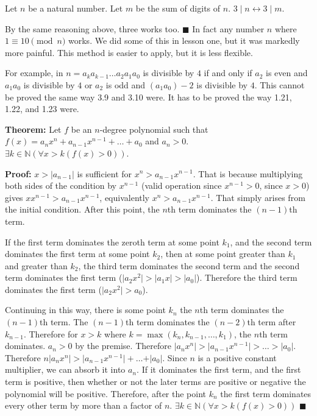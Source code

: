 \item Let \(n\) be a natural number.  Let \(m\) be the sum of digits of \(n\). \(3 \mid n \leftrightarrow 3 \mid m\).

By the same reasoning above, three works too. {\tiny \(\blacksquare\)} In fact any number \(n\) where \(1 \equiv 10 \pmod n\) works. We did some of this in lesson one, but it was markedly more painful. This method is easier to apply, but it is less flexible.

For example, in \(n = a_k a_{k-1} \dots a_2 a_1 a_0\) is divisible by \(4\) if and only if  \(a_2\) is even and \(a_1 a_0\) is divisible by \(4\) or \(a_2\) is odd and \((a_1 a_0) - 2\) is divisible by \(4\). This cannot be proved the same way 3.9 and 3.10 were. It has to be proved the way 1.21, 1.22, and 1.23 were.

\item \textbf{Theorem:} Let \(f\) be an \(n\)-degree polynomial such that \(f(x) = a_n x^n + a_{n-1} x^{n-1} + \dots + a_0 \) and \(a_n > 0\). \(\exists k \in \mathbb N (\forall x > k (f(x) > 0))\).

\textbf{Proof:} \(x > \lvert a_{n-1} \rvert\) is sufficient for \(x^n > a_{n-1} x^{n-1}\). That is because multiplying both sides of the condition by \(x^{n-1}\) (valid operation since \(x^{n-1}>0\), since \(x>0\)) gives \(x x^{n-1} > a_{n-1} x^{n-1}\), equivalently \(x^n  > a_{n-1} x^{n-1}\). That simply arises from the initial condition. After this point, the \(n\)th term dominates the \((n-1)\)th term.

If the first term dominates the zeroth term at some point \(k_1\), and the second term dominates the first term at some point \(k_2\), then at some point greater than \(k_1\) and greater than \(k_2\), the third term dominates the second term and the second term dominates the first term (\(\lvert a_2 x^2 \rvert > \lvert a_1 x \rvert > \lvert a_0 \rvert\)). Therefore the third term dominates the first term (\(\lvert a_2 x^2 \rvert > a_0\)). 

Continuing in this way, there is some point \(k_n\) the \(n\)th term dominates the \((n-1)\)th term. The \((n-1)\)th term dominates the \((n-2)\)th term after \(k_{n-1}\). Therefore for \(x > k\) where \(k = \max(k_n, k_{n-1}, \dots, k_1)\), the \(n\)th term dominates. \(a_n > 0\) by the premise. Therefore \(\lvert a_n x^n \rvert > \lvert a_{n-1} x^{n-1} \rvert > \dots > \rvert a_0 \lvert\). Therefore \(n \lvert a_n x^n \rvert > \lvert a_{n-1} x^{n-1} \rvert + \dots + \rvert a_0 \lvert\). Since \(n\) is a positive constant multiplier, we can absorb it into \(a_n\). If it dominates the first term, and the first term is positive, then whether or not the later terms are positive or negative the polynomial will be positive. Therefore, after the point \(k_n\) the first term dominates every other term by more than a factor of \(n\). \(\exists k \in \mathbb N (\forall x > k (f(x) > 0))\) {\tiny \(\blacksquare\)}

